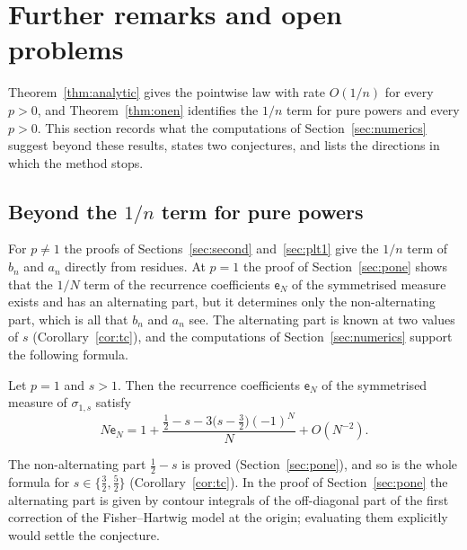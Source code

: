 
\section{Further remarks and open problems}\label{sec:further}

Theorem~\ref{thm:analytic} gives the pointwise law with rate $O(1/n)$ for every $p>0$, and Theorem~\ref{thm:onen}
identifies the $1/n$ term for pure powers and every $p>0$. This section records what the computations of
Section~\ref{sec:numerics} suggest beyond these results, states two conjectures, and lists the directions in which the
method stops.

\subsection{Beyond the \texorpdfstring{$1/n$}{1/n} term for pure powers}\label{sec:onen-open}
For $p\ne1$ the proofs of Sections~\ref{sec:second} and~\ref{sec:plt1} give the $1/n$ term of $b_n$ and $a_n$ directly
from residues. At $p=1$ the proof of Section~\ref{sec:pone} shows that the $1/N$ term of the recurrence coefficients
$\mathsf e_N$ of the symmetrised measure exists and has an alternating part, but it determines only the non-alternating
part, which is all that $b_n$ and $a_n$ see. The alternating part is known at two values of $s$
(Corollary~\ref{cor:tc}), and the computations of Section~\ref{sec:numerics} support the following formula.

\begin{conjecture}\label{conj:alternating}
Let $p=1$ and $s>1$. Then the recurrence coefficients $\mathsf e_N$ of the symmetrised measure of $\sigma_{1,s}$ satisfy
\[
  N\mathsf e_N=1+\frac{\frac12-s-3\bigl(s-\frac32\bigr)(-1)^N}{N}+O(N^{-2}).
\]
\end{conjecture}

The non-alternating part $\frac12-s$ is proved (Section~\ref{sec:pone}), and so is the whole formula for
$s\in\{\frac32,\frac52\}$ (Corollary~\ref{cor:tc}). In the proof of Section~\ref{sec:pone} the alternating part is
given by contour integrals of the off-diagonal part of the first correction of the Fisher--Hartwig model at the origin;
evaluating them explicitly would settle the conjecture.

